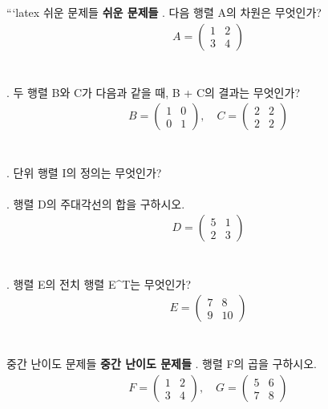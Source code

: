 \documentclass[fleqn]{article}
\begin{document}
      
        ```latex
 쉬운 문제들
\textbf{쉬운 문제들}
. 다음 행렬 A의 차원은 무엇인가?
\begin{align*}
A = \begin{pmatrix}
1 & 2 \\
3 & 4
\end{pmatrix}
\end{align*}
\\\\

. 두 행렬 B와 C가 다음과 같을 때, B + C의 결과는 무엇인가?
\begin{align*}
B = \begin{pmatrix}
1 & 0 \\
0 & 1
\end{pmatrix}, \quad C = \begin{pmatrix}
2 & 2 \\
2 & 2
\end{pmatrix}
\end{align*}
\\\\

. 단위 행렬 I의 정의는 무엇인가? 
\\\\

. 행렬 D의 주대각선의 합을 구하시오.
\begin{align*}
D = \begin{pmatrix}
5 & 1 \\
2 & 3
\end{pmatrix}
\end{align*}
\\\\

. 행렬 E의 전치 행렬 E^T는 무엇인가?
\begin{align*}
E = \begin{pmatrix}
7 & 8 \\
9 & 10
\end{pmatrix}
\end{align*}
\\\\

 중간 난이도 문제들
\textbf{중간 난이도 문제들}
. 행렬 F의 곱을 구하시오.
\begin{align*}
F = \begin{pmatrix}
1 & 2 \\
3 & 4
\end{pmatrix}, \quad G = \begin{pmatrix}
5 & 6 \\
7 & 8
\end{pmatrix}
\end{align*}
\\\\
\end{document}
